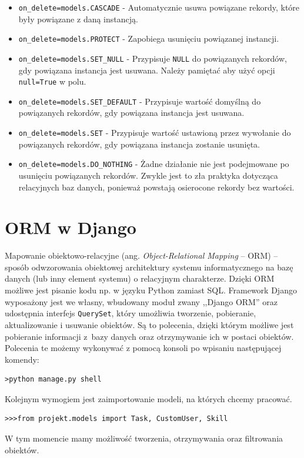 \documentclass[oneside,polski,logo,indent]{amuthesis}
\begin{document}
\begin{itemize}
\item \texttt{on\_delete=models.CASCADE} - Automatycznie usuwa powiązane rekordy, które były powiązane z daną instancją.
\item \texttt{on\_delete=models.PROTECT} - Zapobiega usunięciu powiązanej instancji.
\item \texttt{on\_delete=models.SET\_NULL} - Przypisuje \texttt{NULL} do powiązanych rekordów, gdy powiązana instancja jest usuwana. Należy pamiętać aby użyć opcji \texttt{null=True} w polu.
\item \texttt{on\_delete=models.SET\_DEFAULT} - Przypisuje wartość domyślną do powiązanych rekordów, gdy powiązana instancja jest usuwana.
\item \texttt{on\_delete=models.SET} - Przypisuje wartość ustawioną przez wywołanie do powiązanych rekordów, gdy powiązana instancja zostanie usunięta.
\item \texttt{on\_delete=models.DO\_NOTHING} - Żadne działanie nie jest podejmowane po usunięciu powiązanych rekordów. Zwykle jest to zła praktyka dotycząca relacyjnych baz danych, ponieważ powstają osierocone rekordy bez wartości.
\end{itemize}
\section{ORM w Django}
Mapowanie obiektowo-relacyjne (ang. \emph{Object-Relational Mapping} -- ORM) -- sposób odwzorowania obiektowej architektury systemu informatycznego na bazę danych (lub inny element systemu) o relacyjnym charakterze. Dzięki ORM możliwe jest pisanie kodu np. w języku Python zamiast SQL. Framework Django wyposażony jest we własny, wbudowany moduł zwany ,,Django ORM'' oraz udostępnia interfejs \texttt{QuerySet}, który umożliwia tworzenie, pobieranie, aktualizowanie i usuwanie obiektów. Są to polecenia, dzięki którym możliwe jest pobieranie informacji z~bazy danych oraz otrzymywanie ich w postaci obiektów. Polecenia te możemy wykonywać z pomocą konsoli po wpisaniu następującej komendy:
\begin{lstlisting}[style=DOS]
>python manage.py shell
\end{lstlisting}
Kolejnym wymogiem jest zaimportowanie modeli, na których chcemy pracować.
\begin{lstlisting}[style=DOS]
>>>from projekt.models import Task, CustomUser, Skill
\end{lstlisting}
W tym momencie mamy możliwość tworzenia, otrzymywania oraz filtrowania obiektów.
\end{document}
